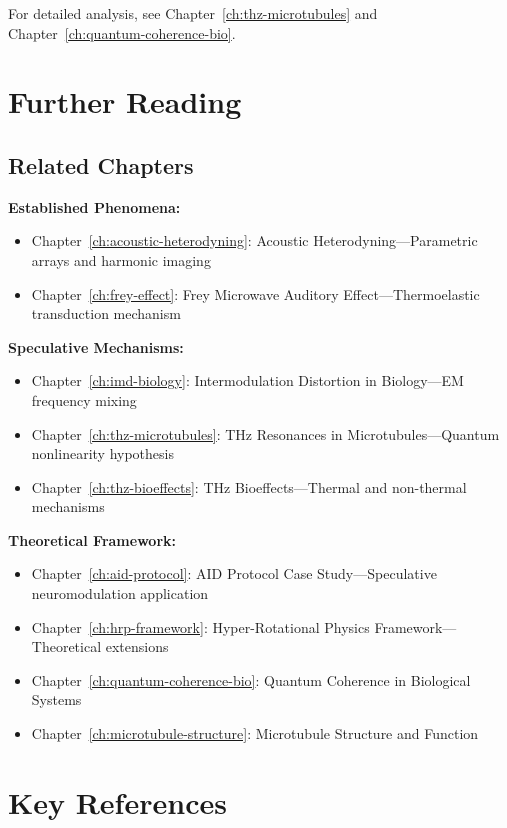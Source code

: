 For detailed analysis, see Chapter~\ref{ch:thz-microtubules} and Chapter~\ref{ch:quantum-coherence-bio}.

\section{Further Reading}

\subsection*{Related Chapters}

\textbf{Established Phenomena:}
\begin{itemize}
\item Chapter~\ref{ch:acoustic-heterodyning}: Acoustic Heterodyning---Parametric arrays and harmonic imaging
\item Chapter~\ref{ch:frey-effect}: Frey Microwave Auditory Effect---Thermoelastic transduction mechanism
\end{itemize}

\textbf{Speculative Mechanisms:}
\begin{itemize}
\item Chapter~\ref{ch:imd-biology}: Intermodulation Distortion in Biology---EM frequency mixing
\item Chapter~\ref{ch:thz-microtubules}: THz Resonances in Microtubules---Quantum nonlinearity hypothesis
\item Chapter~\ref{ch:thz-bioeffects}: THz Bioeffects---Thermal and non-thermal mechanisms
\end{itemize}

\textbf{Theoretical Framework:}
\begin{itemize}
\item Chapter~\ref{ch:aid-protocol}: AID Protocol Case Study---Speculative neuromodulation application
\item Chapter~\ref{ch:hrp-framework}: Hyper-Rotational Physics Framework---Theoretical extensions
\item Chapter~\ref{ch:quantum-coherence-bio}: Quantum Coherence in Biological Systems
\item Chapter~\ref{ch:microtubule-structure}: Microtubule Structure and Function
\end{itemize}

\section{Key References}


